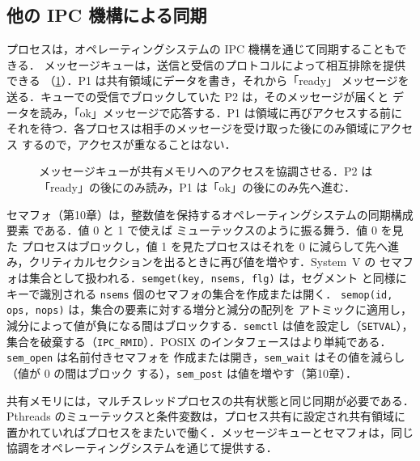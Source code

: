 \documentclass[../main.tex]{subfiles}
\begin{document}
\subsection{他の IPC 機構による同期}

プロセスは，オペレーティングシステムの IPC 機構を通じて同期することもできる．
メッセージキューは，送信と受信のプロトコルによって相互排除を提供できる
（\cref{fig:l09-mq-sync}）．P1 は共有領域にデータを書き，それから「ready」
メッセージを送る．キューでの受信でブロックしていた P2 は，そのメッセージが届くと
データを読み，「ok」メッセージで応答する．P1 は領域に再びアクセスする前に
それを待つ．各プロセスは相手のメッセージを受け取った後にのみ領域にアクセス
するので，アクセスが重なることはない．

\begin{figure}[htbp]
  \centering
  
  \caption{メッセージキューが共有メモリへのアクセスを協調させる．P2 は
    「ready」の後にのみ読み，P1 は「ok」の後にのみ先へ進む．}
  \label{fig:l09-mq-sync}
\end{figure}

セマフォ（第10章）は，整数値を保持するオペレーティングシステムの同期構成要素
である．値 0 と 1 で使えば
ミューテックスのように振る舞う．値 0 を見た
プロセスはブロックし，値 1 を見たプロセスはそれを 0 に減らして先へ進み，クリティカルセクションを出るときに再び値を増やす．System~V の
セマフォは集合として扱われる．\texttt{semget(key, nsems, flg)} は，セグメント
と同様にキーで識別される \texttt{nsems} 個のセマフォの集合を作成または開く．
\texttt{semop(id, ops, nops)} は，集合の要素に対する増分と減分の配列を
アトミックに適用し，減分によって値が負になる間はブロックする．\texttt{semctl}
は値を設定し（\texttt{SETVAL}），集合を破棄する（\texttt{IPC\_RMID}）．POSIX
のインタフェースはより単純である．\texttt{sem\_open} は名前付きセマフォを
作成または開き，\texttt{sem\_wait} はその値を減らし（値が 0 の間はブロック
する），\texttt{sem\_post} は値を増やす（第10章）．

\begin{keypoint}
  共有メモリには，マルチスレッドプロセスの共有状態と同じ同期が必要である．
  Pthreads のミューテックスと条件変数は，プロセス共有に設定され共有領域に
  置かれていればプロセスをまたいで働く．メッセージキューとセマフォは，同じ
  協調をオペレーティングシステムを通じて提供する．
\end{keypoint}
\end{document}
